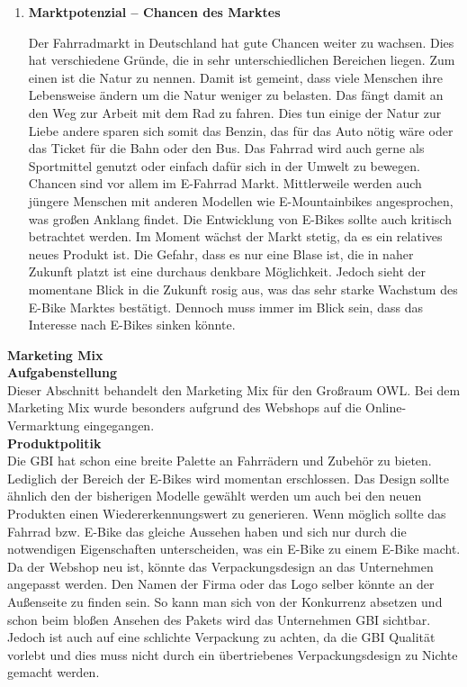 \begin{enumerate}
	\item{\textbf{Marktpotenzial – Chancen des Marktes}}
	
Der Fahrradmarkt in Deutschland hat gute Chancen weiter zu wachsen. Dies hat verschiedene Gründe, die in sehr unterschiedlichen Bereichen liegen. Zum einen ist die Natur zu nennen. Damit ist gemeint, dass viele Menschen ihre Lebensweise ändern um die Natur weniger zu belasten. Das fängt damit an den Weg zur Arbeit mit dem Rad zu fahren. Dies tun einige der Natur zur Liebe andere sparen sich somit das Benzin, das für das Auto nötig wäre oder das Ticket für die Bahn oder den Bus. Das Fahrrad wird auch gerne als Sportmittel genutzt oder einfach dafür sich in der Umwelt zu bewegen.
Chancen sind vor allem im E-Fahrrad Markt. Mittlerweile werden auch jüngere Menschen mit anderen Modellen wie E-Mountainbikes angesprochen, was großen Anklang findet.
Die Entwicklung von E-Bikes sollte auch kritisch betrachtet werden. Im Moment wächst der Markt stetig, da es ein relatives neues Produkt ist. Die Gefahr, dass es nur eine Blase ist, die in naher Zukunft platzt ist eine durchaus denkbare  Möglichkeit. Jedoch sieht der momentane Blick in die Zukunft rosig aus, was das sehr starke Wachstum des E-Bike Marktes bestätigt. Dennoch muss immer im Blick sein, dass das Interesse nach E-Bikes sinken könnte.
\end{enumerate}
\textbf{Marketing Mix}\\

\small{\textbf{Aufgabenstellung}}\\
Dieser Abschnitt behandelt den Marketing Mix für den Großraum OWL. Bei dem Marketing Mix wurde besonders aufgrund des Webshops auf die Online-Vermarktung eingegangen.\\

\small{\textbf{Produktpolitik}}\\
Die GBI hat schon eine breite Palette an Fahrrädern und Zubehör zu bieten. Lediglich der Bereich der E-Bikes wird momentan erschlossen. Das Design sollte ähnlich den der bisherigen Modelle gewählt werden um auch bei den neuen Produkten einen Wiedererkennungswert zu generieren. Wenn möglich sollte das Fahrrad bzw. E-Bike das gleiche Aussehen haben und sich nur durch die notwendigen Eigenschaften unterscheiden, was ein E-Bike zu einem E-Bike macht.\\
Da der Webshop neu ist, könnte das Verpackungsdesign an das Unternehmen angepasst werden. Den Namen der Firma oder das Logo selber könnte an der Außenseite zu finden sein. So kann man sich von der Konkurrenz absetzen und schon beim bloßen Ansehen des Pakets wird das Unternehmen GBI sichtbar. Jedoch ist auch auf eine schlichte Verpackung zu achten, da die GBI Qualität vorlebt und dies muss nicht durch ein übertriebenes Verpackungsdesign zu Nichte gemacht werden.\\


